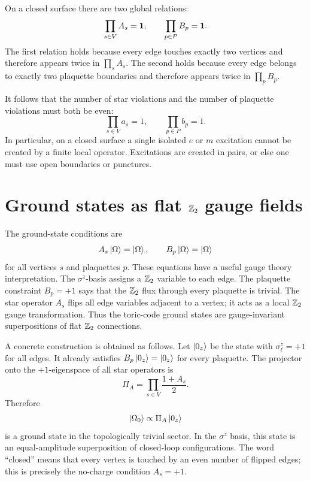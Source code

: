 On a closed surface there are two global relations:
\begin{equation}
\label{eq:toric-code-global-relations}
    \prod_{s\in V} A_s=\mathbf{1},
    \qquad
    \prod_{p\in P} B_p=\mathbf{1} .
\end{equation}
The first relation holds because every edge touches exactly two vertices and
therefore appears twice in \(\prod_s A_s\).  The second holds because every edge
belongs to exactly two plaquette boundaries and therefore appears twice in
\(\prod_p B_p\).

It follows that the number of star violations and the number of plaquette
violations must both be even:
\begin{equation}
\label{eq:toric-code-even-parity-constraints}
    \prod_{s\in V}a_s=1,
    \qquad
    \prod_{p\in P}b_p=1 .
\end{equation}
In particular, on a closed surface a single isolated \(e\) or \(m\) excitation
cannot be created by a finite local operator.  Excitations are created in pairs,
or else one must use open boundaries or punctures.

\section{Ground states as flat \texorpdfstring{\(\mathbb{Z}_2\)}{Z2} gauge fields}
\label{sec:toric-code-ground-states}

The ground-state conditions are
\begin{equation}
\label{eq:toric-code-ground-state-conditions}
    A_s\left|\Omega\right\rangle=\left|\Omega\right\rangle,
    \qquad
    B_p\left|\Omega\right\rangle=\left|\Omega\right\rangle
\end{equation}
for all vertices \(s\) and plaquettes \(p\).  These equations have a useful gauge
theory interpretation.  The \(\sigma^z\)-basis assigns a \(\mathbb{Z}_2\) variable to
each edge.  The plaquette constraint \(B_p=+1\) says that the \(\mathbb{Z}_2\) flux
through every plaquette is trivial.  The star operator \(A_s\) flips all edge
variables adjacent to a vertex; it acts as a local \(\mathbb{Z}_2\) gauge
transformation.  Thus the toric-code ground states are gauge-invariant
superpositions of flat \(\mathbb{Z}_2\) connections.

A concrete construction is obtained as follows.  Let \(
\left|0_z\right\rangle\) be the
state with \(\sigma^z_{\ell}=+1\) for all edges.  It already satisfies
\(B_p\left|0_z\right\rangle=\left|0_z\right\rangle\) for every plaquette.  The projector onto the
\(+1\)-eigenspace of all star operators is
\begin{equation}
\label{eq:toric-code-star-projector}
    \Pi_A
    =
    \prod_{s\in V}\frac{1+A_s}{2} .
\end{equation}
Therefore
\begin{equation}
\label{eq:toric-code-plane-ground-state}
    \left|\Omega_0\right\rangle
    \propto
    \Pi_A\left|0_z\right\rangle
\end{equation}
is a ground state in the topologically trivial sector.  In the \(\sigma^z\)
basis, this state is an equal-amplitude superposition of closed-loop
configurations.  The word ``closed'' means that every vertex is touched by an
even number of flipped edges; this is precisely the no-charge condition
\(A_s=+1\).

